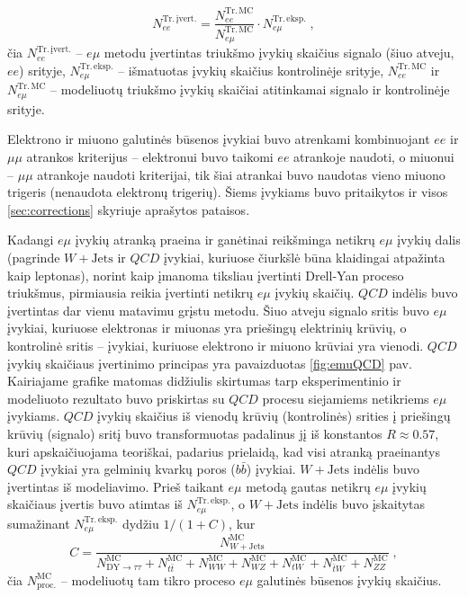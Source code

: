 \documentclass[a4paper, 12pt, twoside]{article}
\newcommand{\emu}{e\mu}
\newlength\q
\begin{document}
\begin{equation}
	N_{ee}^{\mathrm{Tr. \, įvert.}} =
	\frac{ N_{ee}^{\mathrm{Tr. \, MC}} }{ N_{e\mu}^{\mathrm{Tr. \, MC}} }
	\cdot N_{e\mu}^{\mathrm{Tr. \, eksp.}} \; ,
	\label{eq:emuMethod}
\end{equation}
čia $N_{ee}^{\mathrm{Tr. \, įvert.}}$ -- $\emu$ metodu įvertintas triukšmo įvykių skaičius signalo
(šiuo atveju, $ee$) srityje, $N_{e\mu}^{\mathrm{Tr. \, eksp.}}$ -- išmatuotas įvykių skaičius
kontrolinėje srityje, $N_{ee}^{\mathrm{Tr. \, MC}}$ ir $N_{e\mu}^{\mathrm{Tr. \, MC}}$ -- modeliuotų
triukšmo įvykių skaičiai atitinkamai signalo ir kontrolinėje srityje.

Elektrono ir miuono galutinės būsenos įvykiai buvo atrenkami kombinuojant $ee$ ir $\mu\mu$ atrankos
kriterijus -- elektronui buvo taikomi $ee$ atrankoje naudoti, o miuonui -- $\mu\mu$ atrankoje naudoti
kriterijai, tik šiai atrankai buvo naudotas vieno miuono trigeris (nenaudota elektronų trigerių).
Šiems įvykiams buvo pritaikytos ir visos \ref{sec:corrections} skyriuje aprašytos pataisos.

Kadangi $\emu$ įvykių atranką praeina ir ganėtinai reikšminga netikrų $\emu$ įvykių dalis (pagrinde
$W+\mathrm{Jets}$ ir $QCD$ įvykiai, kuriuose čiurkšlė būna klaidingai atpažinta kaip leptonas),
norint kaip įmanoma tiksliau įvertinti Drell-Yan proceso triukšmus, pirmiausia reikia
įvertinti netikrų $\emu$ įvykių skaičių.
$QCD$ indėlis buvo įvertintas dar vienu matavimu grįstu metodu.
Šiuo atveju signalo sritis buvo $\emu$ įvykiai, kuriuose elektronas ir miuonas yra priešingų elektrinių
krūvių, o kontrolinė sritis -- įvykiai, kuriuose elektrono ir miuono krūviai yra vienodi.
$QCD$ įvykių skaičiaus įvertinimo principas yra pavaizduotas \ref{fig:emuQCD} pav.
Kairiajame grafike matomas didžiulis skirtumas tarp eksperimentinio ir modeliuoto rezultato buvo
priskirtas su $QCD$ procesu siejamiems netikriems $\emu$ įvykiams.
$QCD$ įvykių skaičius iš vienodų krūvių (kontrolinės) srities į priešingų krūvių (signalo) sritį
buvo transformuotas padalinus jį iš konstantos $R\approx 0.57$, kuri apskaičiuojama teoriškai,
padarius prielaidą, kad visi atranką praeinantys $QCD$ įvykiai yra gelminių kvarkų poros
($b\bar{b}$) įvykiai.
$W+\mathrm{Jets}$ indėlis buvo įvertintas iš modeliavimo.
Prieš taikant $\emu$ metodą gautas netikrų $\emu$ įvykių skaičiaus įvertis buvo atimtas iš
$N_{e\mu}^{\mathrm{Tr. \, eksp.}}$, o $W+\mathrm{Jets}$ indėlis buvo įskaitytas sumažinant
$N_{e\mu}^{\mathrm{Tr. \, eksp.}}$ dydžiu $1/(1+C)$, kur
\begin{equation*}
	C = \frac{ N_{W+\mathrm{Jets}}^{\mathrm{MC}} } { N_{\mathrm{DY}\rightarrow\tau\tau}^{\mathrm{MC}} + 
	N_{t\bar{t}}^{\mathrm{MC}} + N_{WW}^{\mathrm{MC}} + N_{WZ}^{\mathrm{MC}} + N_{tW}^{\mathrm{MC}} + N_{\bar{t}W}^{\mathrm{MC}} +
	N_{ZZ}^{\mathrm{MC}} } \; ,
\end{equation*}
čia $N^{\mathrm{MC}}_{\mathrm{proc.}}$ -- modeliuotų tam tikro proceso $\emu$ galutinės būsenos įvykių skaičius.
\end{document}
